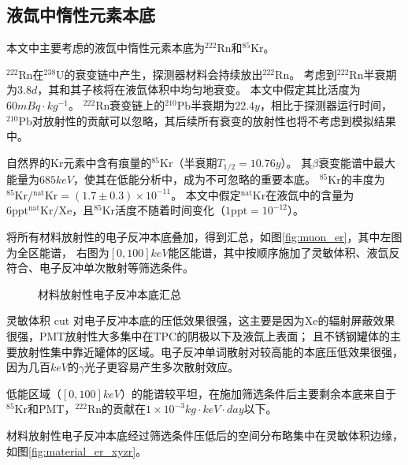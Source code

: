 \subsection{液氙中惰性元素本底}

本文中主要考虑的液氙中惰性元素本底为${}^{222}\mathrm{Rn}$和${}^{85}\mathrm{Kr}$。

${}^{222}\mathrm{Rn}$在${}^{238}\mathrm{U}$的衰变链中产生，探测器材料会持续放出${}^{222}\mathrm{Rn}$。
考虑到${}^{222}\mathrm{Rn}$半衰期为$3.8d$，其和其子核将在液氙体积中均匀地衰变\cite{the_xenon_collaboration_projected_2020}。
本文中假定其比活度为$60\si{mBq\cdot kg^{-1}}$。
${}^{222}\mathrm{Rn}$衰变链上的${}^{210}\mathrm{Pb}$半衰期为$22.4y$，相比于探测器运行时间，
${}^{210}\mathrm{Pb}$对放射性的贡献可以忽略，其后续所有衰变的放射性也将不考虑到模拟结果中。

自然界的$\mathrm{Kr}$元素中含有痕量的${}^{85}\mathrm{Kr}$（半衰期$T_{1/2}=10.76y$）。
其$\beta$衰变能谱中最大能量为$685\si{keV}$，使其在低能分析中，成为不可忽略的重要本底。
${}^{85}\mathrm{Kr}$的丰度为${}^{85}\mathrm{Kr}/{}^\mathrm{nat}\mathrm{Kr}=(1.7\pm0.3)\times 10^{-11}$\cite{the_xenon_collaboration_projected_2020}。
本文中假定${}^\mathrm{nat}\mathrm{Kr}$在液氙中的含量为$6\mathrm{ppt}{}^\mathrm{nat}\mathrm{Kr}/\mathrm{Xe}$，且${}^{85}\mathrm{Kr}$活度不随着时间变化（$1\mathrm{ppt}=10^{-12}$）。

将所有材料放射性的电子反冲本底叠加，得到汇总，如图\ref{fig:muon_er}，其中左图为全区能谱，
右图为$[0, 100]\si{keV}$能区能谱，其中按顺序施加了灵敏体积、液氙反符合、电子反冲单次散射等筛选条件。

\begin{figure}
  \centering
  
  \caption{\label{fig:material_er} 材料放射性电子反冲本底汇总}
\end{figure}

灵敏体积 cut 对电子反冲本底的压低效果很强，这主要是因为$\mathrm{Xe}$的辐射屏蔽效果很强，PMT放射性大多集中在TPC的阴极以下及液氙上表面；
且不锈钢罐体的主要放射性集中靠近罐体的区域。电子反冲单词散射对较高能的本底压低效果很强，因为几百$\si{keV}$的$\gamma$光子更容易产生多次散射效应。

低能区域（$[0, 100]\si{keV}$）的能谱较平坦，在施加筛选条件后主要剩余本底来自于${}^{85}\mathrm{Kr}$和PMT，${}^{222}\mathrm{Rn}$的贡献在$1\times10^{-3}\si{kg}\cdot\si{keV}\cdot\si{day}$以下。

材料放射性电子反冲本底经过筛选条件压低后的空间分布略集中在灵敏体积边缘，如图\ref{fig:material_er_xyzr}。

